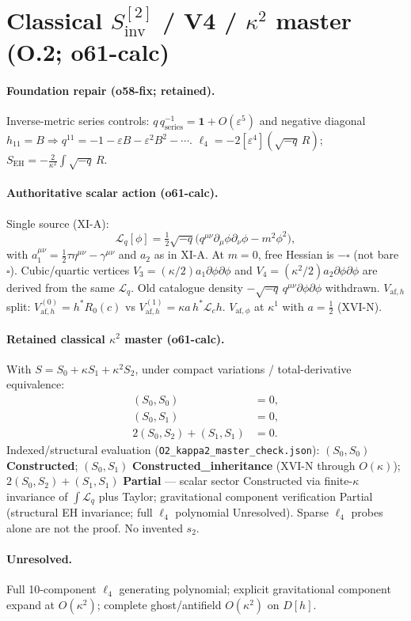 \section{Classical $S_{\mathrm{inv}}^{[2]}$ / V4 / $\kappa^2$ master (O.2; o61-calc)}
\label{sec:O-S2}

\paragraph{Foundation repair (o58-fix; retained).}
Inverse-metric series controls: $q\,q^{-1}_{\mathrm{series}}=\mathbf{1}+O(\varepsilon^5)$ and
negative diagonal $h_{11}=B\Rightarrow q^{11}=-1-\varepsilon B-\varepsilon^2 B^2-\cdots$.
$\ell_4=-2[\varepsilon^4](\sqrt{-q}\,R)$; $S_{\mathrm{EH}}=-\frac{2}{\kappa^2}\int\sqrt{-q}\,R$.

\paragraph{Authoritative scalar action (o61-calc).}
Single source (XI-A):
\[
  \mathcal L_q[\phi]=\tfrac12\sqrt{-q}\bigl(q^{\mu\nu}\partial_\mu\phi\partial_\nu\phi-m^2\phi^2\bigr),
\]
with $a_1^{\mu\nu}=\tfrac12\tau\eta^{\mu\nu}-\gamma^{\mu\nu}$ and $a_2$ as in XI-A.
At $m=0$, free Hessian is $-\square$ (not bare $\square$).
Cubic/quartic vertices
$V_3=(\kappa/2)a_1\partial\phi\partial\phi$ and $V_4=(\kappa^2/2)a_2\partial\phi\partial\phi$
are derived from the same $\mathcal L_q$. Old catalogue density $-\sqrt{-q}\,q^{\mu\nu}\partial\phi\partial\phi$ withdrawn.
$V_{\mathrm{af},h}$ split: $V_{\mathrm{af},h}^{(0)}=h^*R_0(c)$ vs $V_{\mathrm{af},h}^{(1)}=\kappa a\,h^*\mathcal L_c h$.
$V_{\mathrm{af},\phi}$ at $\kappa^1$ with $a=\tfrac12$ (XVI-N).

\paragraph{Retained classical $\kappa^2$ master (o61-calc).}
With $S=S_0+\kappa S_1+\kappa^2 S_2$, under compact variations / total-derivative equivalence:
\begin{align}
  (S_0,S_0)&=0,\\
  (S_0,S_1)&=0,\\
  2(S_0,S_2)+(S_1,S_1)&=0.
\end{align}
Indexed/structural evaluation (\texttt{O2\_kappa2\_master\_check.json}):
$(S_0,S_0)$ \textbf{Constructed}; $(S_0,S_1)$ \textbf{Constructed\_inheritance} (XVI-N through $O(\kappa)$);
$2(S_0,S_2)+(S_1,S_1)$ \textbf{Partial} --- scalar sector Constructed via finite-$\kappa$ invariance of $\int\mathcal L_q$ plus Taylor;
gravitational component verification Partial (structural EH invariance; full $\ell_4$ polynomial Unresolved).
Sparse $\ell_4$ probes alone are not the proof. No invented $s_2$.

\paragraph{Unresolved.}
Full 10-component $\ell_4$ generating polynomial; explicit gravitational component expand at $O(\kappa^2)$;
complete ghost/antifield $O(\kappa^2)$ on $D[h]$.
